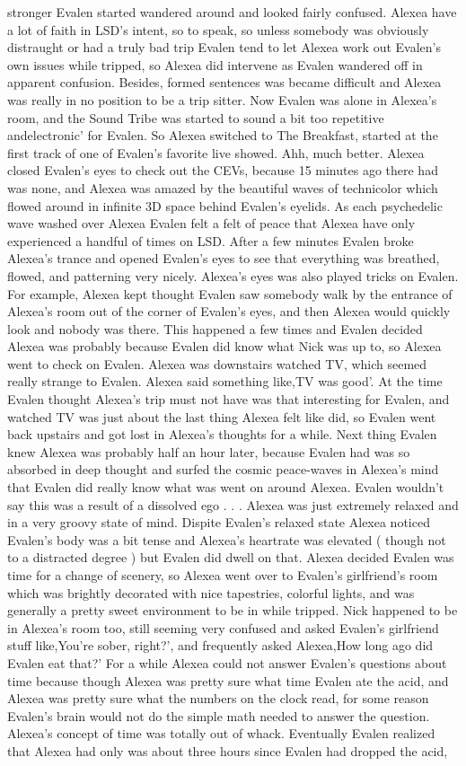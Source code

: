 \documentclass[12pt]{book}
\begin{document}
stronger Evalen started wandered around and looked fairly confused. Alexea have a lot of faith in LSD's intent, so to speak, so unless somebody was obviously distraught or had a truly bad trip Evalen tend to let Alexea work out Evalen's own issues while tripped, so Alexea did intervene as Evalen wandered off in apparent confusion. Besides, formed sentences was became difficult and Alexea was really in no position to be a trip sitter. Now Evalen was alone in Alexea's room, and the Sound Tribe was started to sound a bit too repetitive andelectronic' for Evalen. So Alexea switched to The Breakfast, started at the first track of one of Evalen's favorite live showed. Ahh, much better. Alexea closed Evalen's eyes to check out the CEVs, because 15 minutes ago there had was none, and Alexea was amazed by the beautiful waves of technicolor which flowed around in infinite 3D space behind Evalen's eyelids. As each psychedelic wave washed over Alexea Evalen felt a felt of peace that Alexea have only experienced a handful of times on LSD. After a few minutes Evalen broke Alexea's trance and opened Evalen's eyes to see that everything was breathed, flowed, and patterning very nicely. Alexea's eyes was also played tricks on Evalen. For example, Alexea kept thought Evalen saw somebody walk by the entrance of Alexea's room out of the corner of Evalen's eyes, and then Alexea would quickly look and nobody was there. This happened a few times and Evalen decided Alexea was probably because Evalen did know what Nick was up to, so Alexea went to check on Evalen. Alexea was downstairs watched TV, which seemed really strange to Evalen. Alexea said something like,TV was good'. At the time Evalen thought Alexea's trip must not have was that interesting for Evalen, and watched TV was just about the last thing Alexea felt like did, so Evalen went back upstairs and got lost in Alexea's thoughts for a while. Next thing Evalen knew Alexea was probably half an hour later, because Evalen had was so absorbed in deep thought and surfed the cosmic peace-waves in Alexea's mind that Evalen did really know what was went on around Alexea. Evalen wouldn't say this was a result of a dissolved ego . . .  Alexea was just extremely relaxed and in a very groovy state of mind. Dispite Evalen's relaxed state Alexea noticed Evalen's body was a bit tense and Alexea's heartrate was elevated ( though not to a distracted degree ) but Evalen did dwell on that. Alexea decided Evalen was time for a change of scenery, so Alexea went over to Evalen's girlfriend's room which was brightly decorated with nice tapestries, colorful lights, and was generally a pretty sweet environment to be in while tripped. Nick happened to be in Alexea's room too, still seeming very confused and asked Evalen's girlfriend stuff like,You're sober, right?', and frequently asked Alexea,How long ago did Evalen eat that?' For a while Alexea could not answer Evalen's questions about time because though Alexea was pretty sure what time Evalen ate the acid, and Alexea was pretty sure what the numbers on the clock read, for some reason Evalen's brain would not do the simple math needed to answer the question. Alexea's concept of time was totally out of whack. Eventually Evalen realized that Alexea had only was about three hours since Evalen had dropped the acid, 
\end{document}
